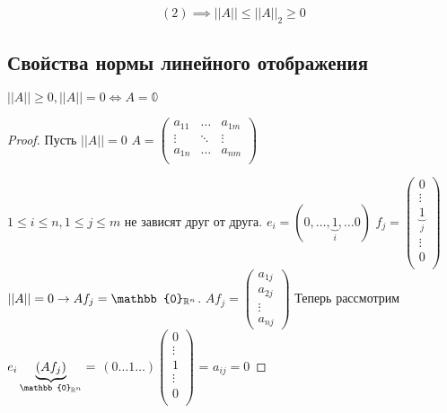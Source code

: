 \documentclass[main]{subfiles}
\begin{document}
\[(2) \implies ||A|| \leq ||A||_2 \geq 0\]

\subsection*{Свойства нормы линейного отображения}
 \begin{theorem}$||A|| \geq 0, ||A|| = 0 \Leftrightarrow A = \mathbb{0}$ \end{theorem}
    \begin{proof}
        Пусть $||A|| = 0$ 
        $A = \begin{pmatrix}
            a_{11} & \ldots & a_{1m} \\
            \vdots & \ddots & \vdots \\
            a_{1n} & \ldots & a_{nm} \\
        \end{pmatrix}$
        
        $1 \leq i \leq n, 1 \leq j \leq m$ не зависят друг от друга.
        \newline
        $e_i = (0, \ldots, \underbrace{1}_i, \ldots 0)$
        $f_j = \begin{pmatrix}
            0 \\
            \vdots \\
            \underbrace{1}_j \\
            \vdots \\
            0 \\ \end{pmatrix}$
        \newline
        $||A|| = 0 \rightarrow Af_j = \mathbb{0}_{{\vR}^n} $.
        $Af_j =
        \begin{pmatrix}
            a_{1j} \\
            a_{2j}\\
            \vdots \\
            a_{nj}
        \end{pmatrix} $
        Теперь рассмотрим $e_i \underbrace{(Af_j)}_{\mathbb{0}_{{\vR}^n}} =$
        $ (0 \ldots 1 \ldots) \begin{pmatrix}
            0 \\
            \vdots \\
            1 \\
            \vdots \\
            0 \\ \end{pmatrix}$ = $a_{ij} = 0$
    \end{proof}
\end{document}
